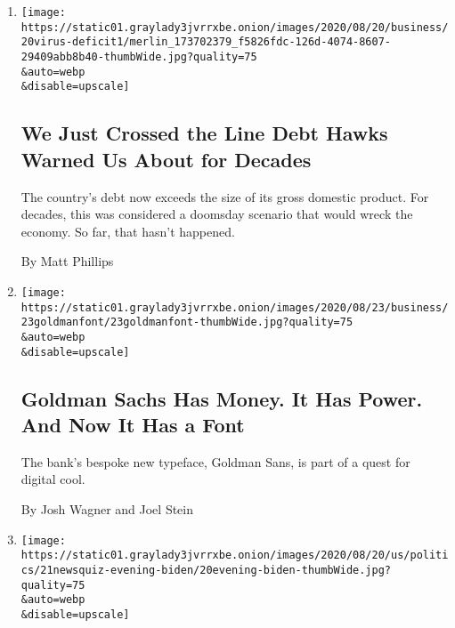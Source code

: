 \begin{enumerate}
\def\labelenumi{\arabic{enumi}.}
\item
  \href{/2020/08/21/business/economy/national-debt-coronavirus-stimulus.html}{}

  \texttt{[image: https://static01.graylady3jvrrxbe.onion/images/2020/08/20/business/20virus-deficit1/merlin\_173702379\_f5826fdc-126d-4074-8607-29409abb8b40-thumbWide.jpg?quality=75\\\&auto=webp\\\&disable=upscale]}

  \hypertarget{we-just-crossed-the-line-debt-hawks-warned-us-about-for-decades}{%
  \subsection{We Just Crossed the Line Debt Hawks Warned Us About for
  Decades}\label{we-just-crossed-the-line-debt-hawks-warned-us-about-for-decades}}

  The country's debt now exceeds the size of its gross domestic product.
  For decades, this was considered a doomsday scenario that would wreck
  the economy. So far, that hasn't happened.

  By Matt Phillips
\item
  \href{/2020/08/21/business/goldman-sachs-has-money-it-has-power-and-now-it-has-a-font.html}{}

  \texttt{[image: https://static01.graylady3jvrrxbe.onion/images/2020/08/23/business/23goldmanfont/23goldmanfont-thumbWide.jpg?quality=75\\\&auto=webp\\\&disable=upscale]}

  \hypertarget{goldman-sachs-has-money-it-has-power-and-now-it-has-a-font}{%
  \subsection{Goldman Sachs Has Money. It Has Power. And Now It Has a
  Font}\label{goldman-sachs-has-money-it-has-power-and-now-it-has-a-font}}

  The bank's bespoke new typeface, Goldman Sans, is part of a quest for
  digital cool.

  By Josh Wagner and Joel Stein
\item
  \href{/interactive/2020/08/21/briefing/democrats-russia-herd-immunity-news-quiz.html}{}

  \texttt{[image: https://static01.graylady3jvrrxbe.onion/images/2020/08/20/us/politics/21newsquiz-evening-biden/20evening-biden-thumbWide.jpg?quality=75\\\&auto=webp\\\&disable=upscale]}

  \hypertarget{news-quiz-democrats-russia-herd-immunity}{%
}
\end{enumerate}
